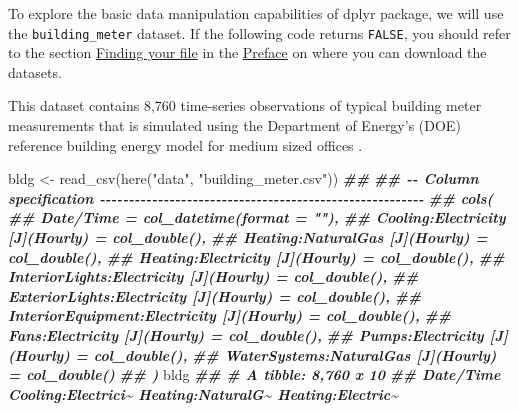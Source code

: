 \documentclass[
]{book}
\newenvironment{Shaded}{\begin{snugshade}}{\end{snugshade}}
\newcommand{\DocumentationTok}[1]{\textcolor[rgb]{0.56,0.35,0.01}{\textbf{\textit{#1}}}}
\newcommand{\FunctionTok}[1]{\textcolor[rgb]{0.00,0.00,0.00}{#1}}
\newcommand{\NormalTok}[1]{#1}
\newcommand{\OtherTok}[1]{\textcolor[rgb]{0.56,0.35,0.01}{#1}}
\newcommand{\StringTok}[1]{\textcolor[rgb]{0.31,0.60,0.02}{#1}}
\begin{document}
To explore the basic data manipulation capabilities of dplyr package, we will use the \texttt{building\_meter} dataset. If the following code returns \texttt{FALSE}, you should refer to the section \protect\hyperlink{finding-your-file}{Finding your file} in the \protect\hyperlink{preface}{Preface} on where you can download the datasets.

This dataset contains 8,760 time-series observations of typical building meter measurements that is simulated using the Department of Energy's (DOE) reference building energy model for medium sized offices \citep{deru_us_2011}.

\begin{Shaded}
\begin{Highlighting}[]
\NormalTok{bldg }\OtherTok{\textless{}{-}} \FunctionTok{read\_csv}\NormalTok{(}\FunctionTok{here}\NormalTok{(}\StringTok{"data"}\NormalTok{, }\StringTok{"building\_meter.csv"}\NormalTok{))}
\DocumentationTok{\#\# }
\DocumentationTok{\#\# {-}{-} Column specification {-}{-}{-}{-}{-}{-}{-}{-}{-}{-}{-}{-}{-}{-}{-}{-}{-}{-}{-}{-}{-}{-}{-}{-}{-}{-}{-}{-}{-}{-}{-}{-}{-}{-}{-}{-}{-}{-}{-}{-}{-}{-}{-}{-}{-}{-}{-}{-}{-}{-}{-}{-}{-}{-}{-}{-}}
\DocumentationTok{\#\# cols(}
\DocumentationTok{\#\#   \textasciigrave{}Date/Time\textasciigrave{} = col\_datetime(format = ""),}
\DocumentationTok{\#\#   \textasciigrave{}Cooling:Electricity [J](Hourly)\textasciigrave{} = col\_double(),}
\DocumentationTok{\#\#   \textasciigrave{}Heating:NaturalGas [J](Hourly)\textasciigrave{} = col\_double(),}
\DocumentationTok{\#\#   \textasciigrave{}Heating:Electricity [J](Hourly)\textasciigrave{} = col\_double(),}
\DocumentationTok{\#\#   \textasciigrave{}InteriorLights:Electricity [J](Hourly)\textasciigrave{} = col\_double(),}
\DocumentationTok{\#\#   \textasciigrave{}ExteriorLights:Electricity [J](Hourly)\textasciigrave{} = col\_double(),}
\DocumentationTok{\#\#   \textasciigrave{}InteriorEquipment:Electricity [J](Hourly)\textasciigrave{} = col\_double(),}
\DocumentationTok{\#\#   \textasciigrave{}Fans:Electricity [J](Hourly)\textasciigrave{} = col\_double(),}
\DocumentationTok{\#\#   \textasciigrave{}Pumps:Electricity [J](Hourly)\textasciigrave{} = col\_double(),}
\DocumentationTok{\#\#   \textasciigrave{}WaterSystems:NaturalGas [J](Hourly)\textasciigrave{} = col\_double()}
\DocumentationTok{\#\# )}
\NormalTok{bldg}
\DocumentationTok{\#\# \# A tibble: 8,760 x 10}
\DocumentationTok{\#\#    \textasciigrave{}Date/Time\textasciigrave{}         \textasciigrave{}Cooling:Electrici\textasciitilde{} \textasciigrave{}Heating:NaturalG\textasciitilde{} \textasciigrave{}Heating:Electric\textasciitilde{}}

\end{Highlighting}
\end{Shaded}
\end{document}
